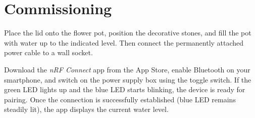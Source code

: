 %
%
%

\section{Commissioning}

Place the lid onto the flower pot, position the decorative stones, and fill the pot with water up to the indicated level. Then connect the permanently attached power cable to a wall socket.

Download the \textit{nRF Connect} app from the App Store, enable Bluetooth on your smartphone, and switch on the power supply box using the toggle switch.  
If the green LED lights up and the blue LED starts blinking, the device is ready for pairing. Once the connection is successfully established (blue LED remains steadily lit), the app displays the current water level.


